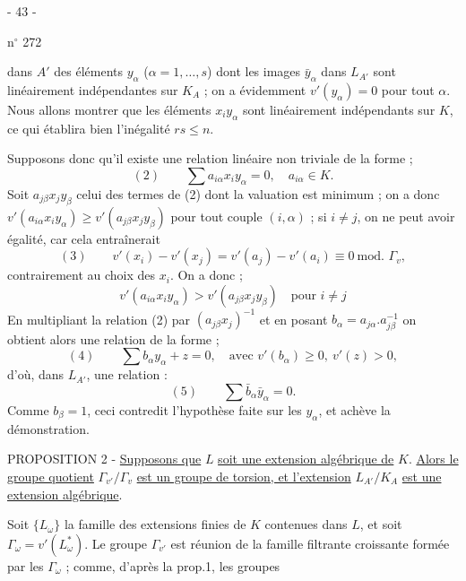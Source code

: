 \begin{center}- 43 -\end{center}
\hfill n$^\circ$ 272

dans $A'$ des éléments $y_\alpha$ ($\alpha=1,\ldots,s$) dont les images $\bar y_\alpha$ dans $L_{A'}$ sont linéairement indépendantes sur $K_A$ ; on a évidemment $v'(y_\alpha)=0$ pour tout $\alpha$. Nous allons montrer que les éléments $x_i y_\alpha$ sont linéairement indépendants sur $K$, ce qui établira bien l'inégalité $rs\leqslant n$.

Supposons donc qu'il existe une relation linéaire non triviale de la forme ;
\[
(2)\qquad \sum a_{i\alpha}x_i y_\alpha=0,\quad a_{i\alpha}\in K.
\]
Soit $a_{j\beta}x_j y_\beta$ celui des termes de (2) dont la valuation est minimum ; on a donc $v'(a_{i\alpha}x_i y_\alpha)\geqslant v'(a_{j\beta}x_j y_\beta)$ pour tout couple $(i,\alpha)$ ; si $i\ne j$, on ne peut avoir égalité, car cela entraînerait
\[
(3)\qquad v'(x_i)-v'(x_j)=v'(a_j)-v'(a_i)\equiv0\ \text{mod. }\Gamma_v,
\]
contrairement au choix des $x_i$. On a donc ;
\[
v'(a_{i\alpha}x_i y_\alpha)>v'(a_{j\beta}x_j y_\beta)\quad\text{pour }i\ne j
\]
En multipliant la relation (2) par $(a_{j\beta}x_j)^{-1}$ et en posant $b_\alpha=a_{j\alpha}.a_{j\beta}^{-1}$ on obtient alors une relation de la forme ;
\[
(4)\qquad \sum b_\alpha y_\alpha+z=0,\quad\text{avec }v'(b_\alpha)\geqslant0,\ v'(z)>0,
\]
d'où, dans $L_{A'}$, une relation :
\[
(5)\qquad\sum\bar b_\alpha\bar y_\alpha=0.
\]
Comme $b_\beta=1$, ceci contredit l'hypothèse faite sur les $y_\alpha$, et achève la démonstration.

PROPOSITION 2 - \uline{Supposons que} $L$ \uline{soit une extension algébrique de} $K$. \uline{Alors le groupe quotient} $\Gamma_{v'}/\Gamma_v$ \uline{est un groupe de torsion, et l'extension} $L_{A'}/K_A$ \uline{est une extension algébrique}.

Soit $\{L_\omega\}$ la famille des extensions finies de $K$ contenues dans $L$, et soit $\Gamma_\omega=v'(L_\omega^*)$. Le groupe $\Gamma_{v'}$ est réunion de la famille filtrante croissante formée par les $\Gamma_\omega$ ; comme, d'après la prop.1, les groupes

